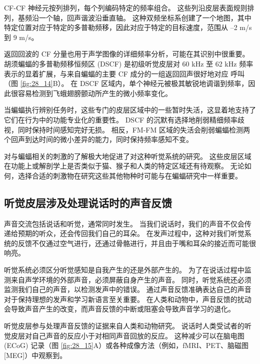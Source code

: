 CF-CF 神经元按列排列，每个列编码特定的频率组合。 
这些列沿皮层表面规则排列，基频沿一个轴，回声谐波沿垂直轴。 
这种双频坐标系创建了一个地图，其中特定位置对应于特定的多普勒频移，因此对应于特定的目标速度，范围从 –2 m/s 到 9 m/s。


返回回波的 CF 分量也用于声学图像的详细频率分析，可能在其识别中很重要。 
胡须蝙蝠的多普勒频移恒频区 (DSCF) 是初级听觉皮层对 60 kHz 至 62 kHz 频率表示的显着扩展，与来自蝙蝠的主要 CF 成分的一组返回回声很好地对应 呼叫（图  \ref{fig:28_14}B）。 
在 DSCF 区域内，单个神经元被极其敏锐地调谐到频率，因此很容易检测到飞蛾翅膀颤动所产生的微小频率变化。


当蝙蝠执行辨别任务时，这些专门的皮层区域中的一些暂时失活，这显着地支持了它们在行为中的功能专业化的重要性。 
DSCF 的沉默有选择地削弱精细频率歧视，同时保持时间感知完好无损。 
相反，FM-FM 区域的失活会削弱蝙蝠检测两个回声到达时间的微小差异的能力，同时保持频率感知不变。


对与蝙蝠相关的刺激的了解极大地促进了对这种听觉系统的研究。 
这些皮层区域在功能上或解剖学上是否类似于猫、猴子和人类的特定区域还有待观察。 
无论如何，选择合适的刺激物在研究这些其他物种时可能与在蝙蝠研究中一样重要。


\subsection{听觉皮层涉及处理说话时的声音反馈}
声音交流包括说话和听觉，通常同时发生。 
当我们说话时，我们的声音不仅会传递给预期的听众，还会传回我们自己的耳朵。 
在发声过程中，这种对我们听觉系统的反馈不仅通过空气进行，还通过骨骼进行，并且由于嘴和耳朵的接近而可能很响亮。


听觉系统必须区分听觉感知是自我产生的还是外部产生的。 
为了在说话过程中监测来自声学环境的外部声音，必须屏蔽自身产生的声音。 
同时，听觉系统还必须监测我们自己的声音，以检测发声中的错误。 
通过声音反馈准确表达自己的声音对于保持理想的发声和学习新语言至关重要。 
在人类和动物中，声音反馈的扰动会导致声音产生的改变，而声音反馈的中断或阻塞会导致声音学习的退化。

听觉皮层参与处理声音反馈的证据来自人类和动物研究。 
说话时人类受试者的听觉皮层对自己声音的反应小于对相同声音回放的反应。
这种减少可以在脑电图 (ECoG) 记录（图 \ref{fig:28_15}A）或各种成像方法（例如，fMRI、PET、脑磁图 [MEG]）中观察到。



